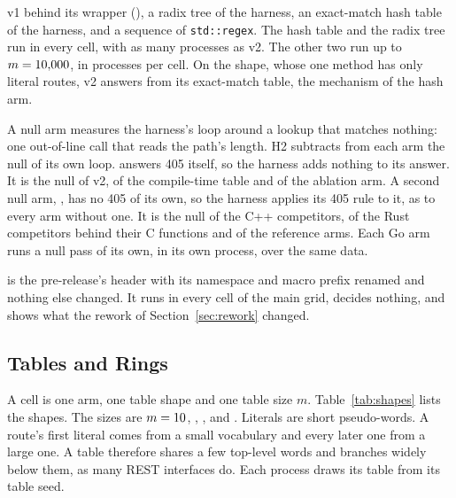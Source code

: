  v1 behind its wrapper (), a radix tree of the
harness, an exact-match hash table of the harness, and a sequence of \texttt{std::regex}. The hash
table and the radix tree run in every cell, with as many processes as v2. The other two run up to
$m=10{,}000$, in \RefReps{} processes per cell. On the  shape, whose one method has
only literal routes, v2 answers from its exact-match table, the mechanism of the hash arm.

 A null arm measures the harness's loop around a lookup that matches nothing:
one out-of-line call that reads the path's length. H2 subtracts from each arm the null of its own
loop.  answers 405 itself, so the harness adds nothing to its answer. It is the null of
v2, of the compile-time table and of the ablation arm. A second null arm, \NullNoFive, has no 405 of
its own, so the harness applies its 405 rule to it, as to every arm without one. It is the null of
the C++ competitors, of the Rust competitors behind their C functions and of the reference arms.
Each Go arm runs a null pass of its own, in its own process, over the same data.

 \AblationArm{} is the pre-release's header with its namespace and macro
prefix renamed and nothing else changed. It runs in every cell of the main grid, decides nothing, and
shows what the rework of Section~\ref{sec:rework} changed.

\subsection{Tables and Rings}\label{sec:tables}

A cell is one arm, one table shape and one table size $m$. Table~\ref{tab:shapes} lists the shapes.
The sizes are $m=10$, \SizeHundred, \SizeThousand, \SizeTenThousand{} and \SizeHundredThousand.
Literals are short pseudo-words. A route's first literal comes from a small vocabulary and every later
one from a large one. A table therefore shares a few top-level words and branches widely below them,
as many REST interfaces do. Each process draws its table from its table seed.


